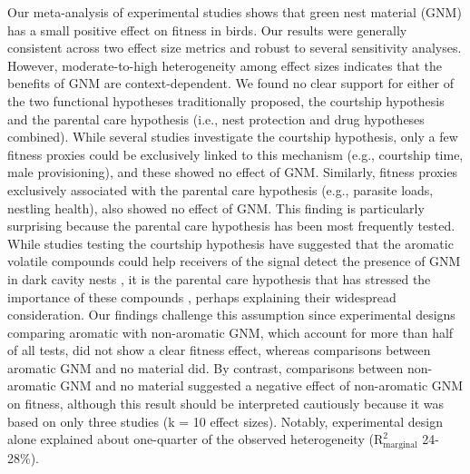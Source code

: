 \documentclass[
  number,
  review,
  onecolumn]{elsarticle}
\begin{document}
Our meta-analysis of experimental studies shows that green nest material
(GNM) has a small positive effect on fitness in birds. Our results were
generally consistent across two effect size metrics and robust to
several sensitivity analyses. However, moderate-to-high heterogeneity
among effect sizes indicates that the benefits of GNM are
context-dependent. We found no clear support for either of the two
functional hypotheses traditionally proposed, the courtship hypothesis
and the parental care hypothesis (i.e., nest protection and drug
hypotheses combined). While several studies investigate the courtship
hypothesis, only a few fitness proxies could be exclusively linked to
this mechanism (e.g., courtship time, male provisioning), and these
showed no effect of GNM. Similarly, fitness proxies exclusively
associated with the parental care hypothesis (e.g., parasite loads,
nestling health), also showed no effect of GNM. This finding is
particularly surprising because the parental care hypothesis has been
most frequently tested. While studies testing the courtship hypothesis
have suggested that the aromatic volatile compounds could help receivers
of the signal detect the presence of GNM in dark cavity nests
\citep{brouwer2004}, it is the parental care hypothesis that has
stressed the importance of these compounds
\citep{fauth1991, clark1988, shutler2007}, perhaps explaining their
widespread consideration. Our findings challenge this assumption since
experimental designs comparing aromatic with non-aromatic GNM, which
account for more than half of all tests, did not show a clear fitness
effect, whereas comparisons between aromatic GNM and no material did. By
contrast, comparisons between non-aromatic GNM and no material suggested
a negative effect of non-aromatic GNM on fitness, although this result
should be interpreted cautiously because it was based on only three
studies (k = 10 effect sizes). Notably, experimental design alone
explained about one-quarter of the observed heterogeneity
(\(\mathrm{R}^2_{\mathrm{marginal}}\) 24-28\%).
\end{document}
